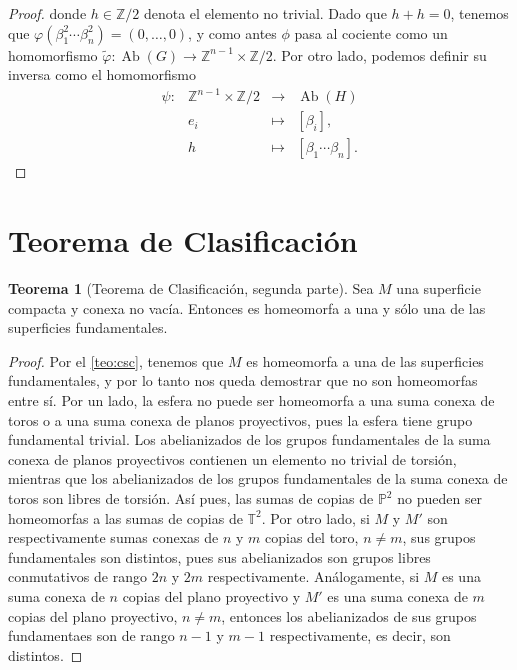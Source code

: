 \documentclass[10pt]{report}
\DeclareMathOperator{\Ab}{Ab}
\newcommand{\Toro}{\mathbb{T}^2}
\newcommand{\Proyectivo}{\mathbb{P}^2}
\theoremstyle{definition}
\newtheorem{tma}[defin]{Teorema}
\begin{document}
\begin{proof}
donde $h\in \mathbb{Z}/2$ denota el elemento no trivial. Dado que $h+h=0$, tenemos que $\varphi \left( \beta_1^2 \cdots \beta_n^2\right) =(0, \dots ,0)$,  y como antes $\phi$ pasa al cociente como un homomorfismo $\tilde{\varphi} :  \Ab{(G)} \to \mathbb{Z}^{n-1} \times \mathbb{Z}/2 $. Por otro lado, podemos definir su inversa como el homomorfismo 
\[
\begin{array}{rccl}
\psi : & \mathbb{Z}^{n-1}  \times \mathbb{Z}/2 & \to & \Ab{(H)} \\
&e_i & \mapsto & \left[ \beta_i \right], \\
&h &\mapsto & \left[ \beta_1 \cdots \beta_n \right].
\end{array}
\]


\end{proof}



\section{Teorema de Clasificación}
\begin{tma}[Teorema de Clasificación, segunda parte]
Sea $M$ una superficie compacta y conexa no vacía. Entonces es homeomorfa a una y sólo una de las superficies fundamentales.
\end{tma}
\begin{proof}
Por el \autoref{teo:csc}, tenemos que $M$ es homeomorfa a una de las superficies fundamentales, y por lo tanto nos queda demostrar que no son homeomorfas entre sí. Por un lado, la esfera no puede ser homeomorfa a una suma conexa de toros o a una suma conexa de planos proyectivos, pues la esfera tiene grupo fundamental trivial. 
Los abelianizados de los grupos fundamentales de la suma conexa de planos proyectivos contienen un elemento no trivial de torsión, mientras que los abelianizados de los grupos fundamentales de la suma conexa de toros son libres de torsión. Así pues, las sumas de copias de $\Proyectivo$ no pueden ser homeomorfas a las sumas de copias de $\Toro$.
Por otro lado, si $M$ y $M'$ son respectivamente sumas conexas de $n$ y $m$ copias del toro, $n\neq m$, sus grupos fundamentales son distintos, pues sus abelianizados son grupos libres conmutativos de rango $2n$ y $2m$ respectivamente.
Análogamente, si $M$ es una suma conexa de $n$ copias del plano proyectivo y $M'$ es una suma conexa de $m$ copias del plano proyectivo, $n\neq m$, entonces los abelianizados de sus grupos fundamentaes son de rango $n-1$ y $m-1$ respectivamente, es decir, son distintos.
\end{proof}
\end{document}
